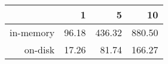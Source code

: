 \begin{tabular}{rrrr}
  \hline
 & 1 & 5 & 10 \\ 
  \hline
in-memory & 96.18 & 436.32 & 880.50 \\ 
  on-disk & 17.26 & 81.74 & 166.27 \\ 
   \hline
\end{tabular}
